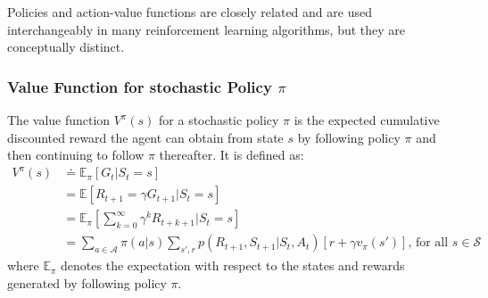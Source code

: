 \documentclass[../xlapes02]{subfiles}
\begin{document}
    Policies and action-value functions are closely related and are used interchangeably in many reinforcement learning algorithms, but they are conceptually distinct.


    \subsubsection{Value Function for stochastic Policy $\pi$}
    The value function $V^{\pi}(s)$ for a stochastic policy $\pi$ is the expected cumulative discounted reward the agent can obtain from state $s$ by following policy $\pi$ and then continuing to follow $\pi$ thereafter. It is defined as:
    \begin{equation}
        \label{eq:Vpi}
        \begin{split}
            V^{\pi}(s) &\doteq \mathbb{E}_{\pi}\left[ G_t|S_t=s \right] \\
            &= \mathbb{E}\left[ R_{t+1} = \gamma G_{t+1} | S_t=s \right] \\
            &= \mathbb{E}_{\pi}\left[ \sum_{k=0}^{\infty}\gamma^k R_{t+k+1}|S_t=s \right] \\
            &= \sum_{a \in \mathcal{A}} \pi(a|s) \sum_{s', r} p(R_{t+1}, S_{t+1}|S_t, A_t) \left[r + \gamma v_{\pi}(s')  \right]\text{, for all } s \in \mathcal{S}
        \end{split}
    \end{equation}
    where $\mathbb{E}_{\pi}$ denotes the expectation with respect to the states and rewards generated by following policy $\pi$.
\end{document}
